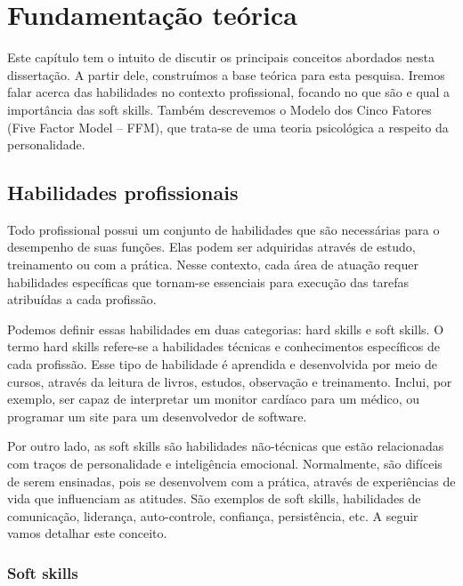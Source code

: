 

\chapter{Fundamentação teórica}

\label{chap:theorical}

Este capítulo tem o intuito de discutir os principais conceitos abordados nesta dissertação. A partir dele, construímos a base teórica para esta pesquisa. Iremos falar acerca das habilidades no contexto profissional, focando no que são e qual a importância das soft skills. Também descrevemos o Modelo dos Cinco Fatores (Five Factor Model – FFM), que trata-se de uma teoria psicológica a respeito da personalidade.

\section{Habilidades profissionais}

Todo profissional possui um conjunto de habilidades que são necessárias para o desempenho de suas funções. Elas podem ser adquiridas através de estudo, treinamento ou com a prática. Nesse contexto, cada área de atuação requer habilidades específicas que tornam-se essenciais para execução das tarefas atribuídas a cada profissão.

Podemos definir essas habilidades em duas categorias: hard skills e soft skills. O termo hard skills refere-se a habilidades técnicas e conhecimentos específicos de cada profissão. Esse tipo de habilidade é aprendida e desenvolvida por meio de cursos, através da leitura de livros, estudos, observação e treinamento. Inclui, por exemplo, ser capaz de interpretar um monitor cardíaco para um médico, ou programar um site para um desenvolvedor de software.

Por outro lado, as soft skills são habilidades não-técnicas que estão relacionadas com traços de personalidade e inteligência emocional. Normalmente, são difíceis de serem ensinadas, pois se desenvolvem com a prática, através de experiências de vida que influenciam as atitudes. São exemplos de soft skills, habilidades de comunicação, liderança, auto-controle, confiança, persistência, etc. A seguir vamos detalhar este conceito.

\subsection{Soft skills}
\label{sec:ss}

